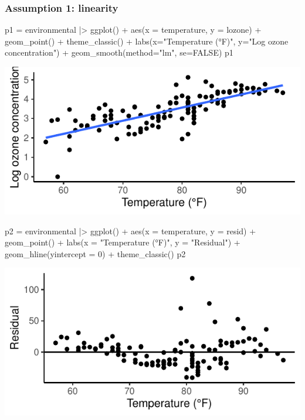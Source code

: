 \documentclass[a4paper]{article}\usepackage[]{graphicx}\usepackage[]{xcolor}
\makeatletter
\def\maxwidth{ %
  \ifdim\Gin@nat@width>\linewidth
    \linewidth
  \else
    \Gin@nat@width
  \fi
}
\makeatother
\begin{document}
\subsubsection{Assumption 1: linearity}
\begin{minipage}[t]{0.49\textwidth}
\begin{Schunk}
\begin{Sinput}
p1 = environmental |> ggplot() + 
  aes(x = temperature, y = lozone) + 
  geom_point() + 
  theme_classic() + 
  labs(x="Temperature (°F)",
       y="Log ozone concentration") +
  geom_smooth(method="lm", se=FALSE)
p1
\end{Sinput}


{\centering \includegraphics[width=\maxwidth]{figure/listings-unnamed-chunk-349-1} 

}

\end{Schunk}
\end{minipage}
\hspace{0.02\textwidth}
\begin{minipage}[t]{0.49\textwidth}
\begin{Schunk}
\begin{Sinput}
p2 = environmental |> ggplot() + 
  aes(x = temperature, y = resid) + 
  geom_point() + 
  labs(x = "Temperature (°F)",
       y = "Residual") +
  geom_hline(yintercept = 0) +
  theme_classic()
p2
\end{Sinput}


{\centering \includegraphics[width=\maxwidth]{figure/listings-unnamed-chunk-350-1} 

}

\end{Schunk}
\end{minipage}
\end{document}
